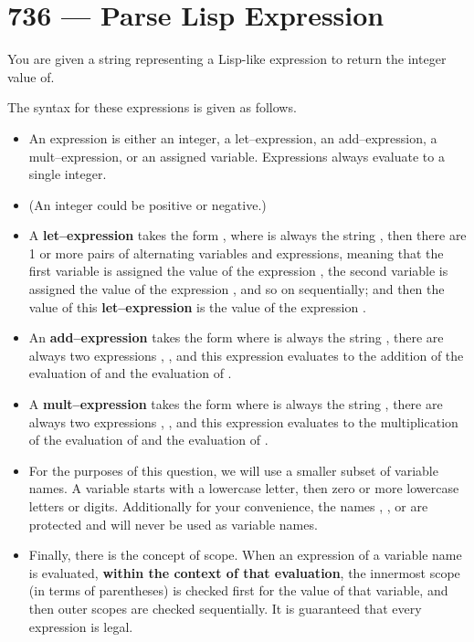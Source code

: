 \section{736 --- Parse Lisp Expression}
You are given a string  representing a Lisp-like expression to return the integer value of.

The syntax for these expressions is given as follows.

\begin{itemize}
\item An expression is either an integer, a let--expression, an add--expression, a mult--expression, or an assigned variable. Expressions always evaluate to a single integer.

\item (An integer could be positive or negative.)

\item A \textbf{let--expression} takes the form , where  is always the string , then there are 1 or more pairs of alternating variables and expressions, meaning that the first variable  is assigned the value of the expression , the second variable  is assigned the value of the expression , and so on sequentially; and then the value of this \textbf{let--expression} is the value of the expression .

\item An \textbf{add--expression} takes the form  where  is always the string , there are always two expressions , , and this expression evaluates to the addition of the evaluation of  and the evaluation of .

\item A \textbf{mult--expression} takes the form  where  is always the string , there are always two expressions , , and this expression evaluates to the multiplication of the evaluation of  and the evaluation of .

\item For the purposes of this question, we will use a smaller subset of variable names. A variable starts with a lowercase letter, then zero or more lowercase letters or digits. Additionally for your convenience, the names , , or  are protected and will never be used as variable names.

\item Finally, there is the concept of scope. When an expression of a variable name is evaluated, \textbf{within the context of that evaluation}, the innermost scope (in terms of parentheses) is checked first for the value of that variable, and then outer scopes are checked sequentially. It is guaranteed that every expression is legal.

\end{itemize}



